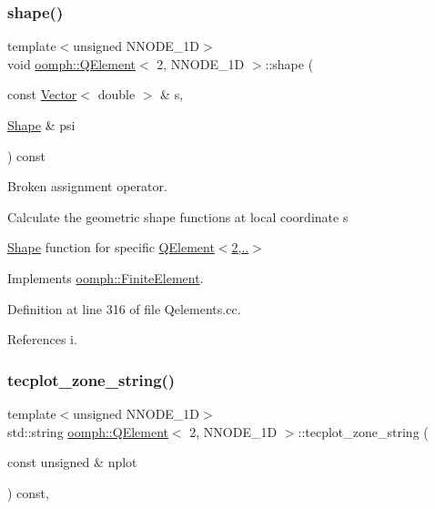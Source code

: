 \subsubsection{\texorpdfstring{shape()}{shape()}}
{\footnotesize\ttfamily template$<$unsigned N\+N\+O\+D\+E\+\_\+1D$>$ \\
void \hyperlink{classoomph_1_1QElement}{oomph\+::\+Q\+Element}$<$ 2, N\+N\+O\+D\+E\+\_\+1D $>$\+::shape (\begin{DoxyParamCaption}\item[{const \hyperlink{classoomph_1_1Vector}{Vector}$<$ double $>$ \&}]{s,  }\item[{\hyperlink{classoomph_1_1Shape}{Shape} \&}]{psi }\end{DoxyParamCaption}) const\hspace{0.3cm}{\ttfamily [virtual]}}



Broken assignment operator. 

Calculate the geometric shape functions at local coordinate s

\hyperlink{classoomph_1_1Shape}{Shape} function for specific \hyperlink{classoomph_1_1QElement_3_012_00_01NNODE__1D_01_4_a6437dbbbf374520208a72e1b1b57cf04}{Q\+Element$<$2,..$>$} 

Implements \hyperlink{classoomph_1_1FiniteElement_a58a25b6859ddd43b7bfe64a19fee5023}{oomph\+::\+Finite\+Element}.



Definition at line 316 of file Qelements.\+cc.



References i.

\mbox{\label{classoomph_1_1QElement_3_012_00_01NNODE__1D_01_4_ab2ec0de2b0e9d8c155a2f099346a9bc3}} 
\subsubsection{\texorpdfstring{tecplot\+\_\+zone\+\_\+string()}{tecplot\_zone\_string()}}
{\footnotesize\ttfamily template$<$unsigned N\+N\+O\+D\+E\+\_\+1D$>$ \\
std\+::string \hyperlink{classoomph_1_1QElement}{oomph\+::\+Q\+Element}$<$ 2, N\+N\+O\+D\+E\+\_\+1D $>$\+::tecplot\+\_\+zone\+\_\+string (\begin{DoxyParamCaption}\item[{const unsigned \&}]{nplot }\end{DoxyParamCaption}) const\hspace{0.3cm}{\ttfamily [inline]}, {\ttfamily [virtual]}}



